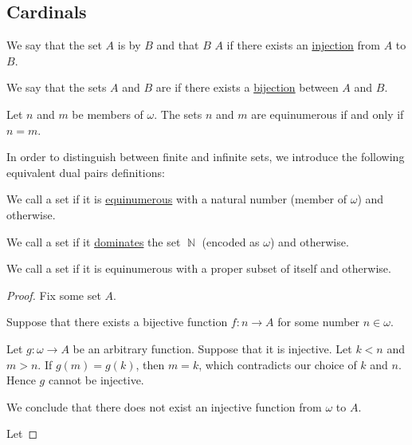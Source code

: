 \subsection{Cardinals}\label{subsec:cardinals}

\begin{definition}\label{def:set_domination}
  We say that the set \( A \) is  by \( B \) and that \( B \)  \( A \) if there exists an \hyperref[def:function_invertibility/injective]{injection} from \( A \) to \( B \).
\end{definition}

\begin{definition}\label{def:equinumerous_sets}
  We say that the sets \( A \) and \( B \) are  if there exists a \hyperref[def:function_invertibility/bijective]{bijection} between \( A \) and \( B \).
\end{definition}

\begin{proposition}\label{thm:finite_ordinals_are_different_carinals}
  Let \( n \) and \( m \) be members of \( \omega \). The sets \( n \) and \( m \) are equinumerous if and only if \( n = m \).
\end{proposition}

\begin{definition}\label{def:infinite_set}
  In order to distinguish between finite and infinite sets, we introduce the following equivalent dual pairs definitions:
  \begin{thmenum}
     We call a set  if it is \hyperref[def:equinumerous_sets]{equinumerous} with a natural number (member of \hyperref[thm:smallest_inductive_set_existence]{\( \omega \)}) and  otherwise.

     We call a set  if it \hyperref[def:set_domination]{dominates} the set \( \BbbN \) (encoded as \( \omega \)) and  otherwise.

     We call a set  if it is equinumerous with a proper subset of itself and  otherwise.
  \end{thmenum}
\end{definition}
\begin{proof}
  Fix some set \( A \).

   Suppose that there exists a bijective function \( f: n \to A \) for some number \( n \in \omega \).

  Let \( g: \omega \to A \) be an arbitrary function. Suppose that it is injective. Let \( k < n \) and \( m > n \). If \( g(m) = g(k) \), then \( m = k \), which contradicts our choice of \( k \) and \( n \). Hence \( g \) cannot be injective.

  We conclude that there does not exist an injective function from \( \omega \) to \( A \).

   Let
\end{proof}

